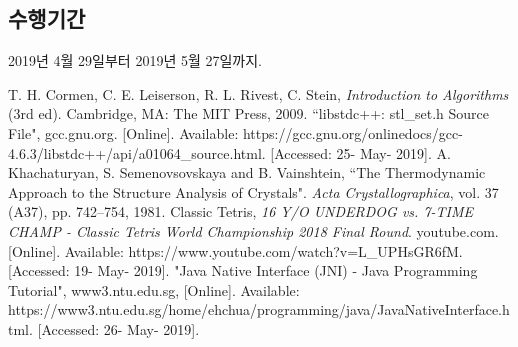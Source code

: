 \subsection{수행기간}
2019년 4월 29일부터 2019년 5월 27일까지.

\begin{thebibliography}{1}
     T. H. Cormen, C. E. Leiserson, R. L. Rivest, C. Stein, \textit{Introduction
    to Algorithms} (3rd ed). Cambridge, MA: The MIT Press, 2009.
     ``libstdc++: stl_set.h Source File", gcc.gnu.org. [Online].
    Available: https://gcc.gnu.org/onlinedocs/gcc-4.6.3/libstdc++/api/a01064_source.html.
    [Accessed: 25- May- 2019].
     A. Khachaturyan, S. Semenovsovskaya and B. Vainshtein,
    ``The Thermodynamic Approach to the Structure Analysis of Crystals". \textit{Acta Crystallographica}, vol. 37 (A37), pp. 742–754, 1981.
     Classic Tetris, \textit{16 Y/O UNDERDOG vs. 7-TIME CHAMP - Classic Tetris World Championship 2018 Final Round}. youtube.com. [Online].
    Available: https://www.youtube.com/watch?v=L_UPHsGR6fM. [Accessed: 19- May- 2019].
     "Java Native Interface (JNI) - Java Programming Tutorial", www3.ntu.edu.sg,
    [Online]. Available: https://www3.ntu.edu.sg/home/ehchua/programming/java/JavaNativeInterface.html. [Accessed: 26- May- 2019].
\end{thebibliography}


